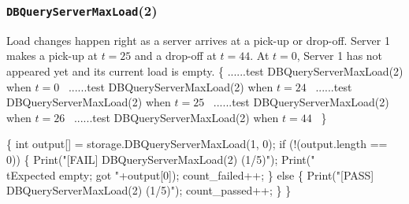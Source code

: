 \documentclass{article}
\def\nwendcode{\endtrivlist \endgroup}
\let\nwdocspar=\par
\begin{document}
\subsubsection{{\tt{}DBQueryServerMaxLoad}(2)}
Load changes happen right as a server arrives at a pick-up or drop-off.
Server 1 makes a pick-up at $t=25$ and a drop-off at $t=44$. At $t=0$, Server 1
has not appeared yet and its current load is empty.
\nwenddocs{}\endmoddef{}
\{
  \LA{}......test \code{}DBQueryServerMaxLoad\edoc{}(2) when $t=0$~{\nwtagstyle{}}\RA{}
  \LA{}......test \code{}DBQueryServerMaxLoad\edoc{}(2) when $t=24$~{\nwtagstyle{}}\RA{}
  \LA{}......test \code{}DBQueryServerMaxLoad\edoc{}(2) when $t=25$~{\nwtagstyle{}}\RA{}
  \LA{}......test \code{}DBQueryServerMaxLoad\edoc{}(2) when $t=26$~{\nwtagstyle{}}\RA{}
  \LA{}......test \code{}DBQueryServerMaxLoad\edoc{}(2) when $t=44$~{\nwtagstyle{}}\RA{}
\}
\nwendcode{}\nwdocspar
\nwenddocs{}\endmoddef{}
\{
  int output[] = storage.DBQueryServerMaxLoad(1, 0);
  if (!(output.length == 0)) \{
    Print("[FAIL] DBQueryServerMaxLoad(2) (1/5)");
    Print("\\tExpected empty; got "+output[0]);
    count_failed++;
  \} else \{
    Print("[PASS] DBQueryServerMaxLoad(2) (1/5)");
    count_passed++;
  \}
\}
\nwendcode{}\nwdocspar
\nwenddocs{}\endmoddef{}
\end{document}
